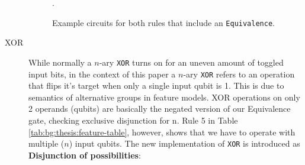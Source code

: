 \begin{description}
    \begin{figure}[H]
        \centering
        \caption[Equivalence Gate Circuit]{Example circuits for both rules that include an \texttt{Equivalence}.}.
        \label{fig:bg:thesis:equivalence-circuit}
    \end{figure}

    \item[XOR]
    While normally a $n$-ary \texttt{XOR} turns on for an uneven amount of toggled input bits, in the context of this paper a $n$-ary \texttt{XOR} refers to an operation that flips it’s target when only a single input qubit is 1. 
    This is due to semantics of alternative groups in feature models.
    XOR operations on only 2 operands (qubits) are basically the negated version of our Equivalence gate, checking exclusive disjunction for n. 
    Rule 5 in Table \ref{tab:bg:thesis:feature-table}, however, shows that we have to operate with multiple ($n$) input qubits.
    The new implementation of \texttt{XOR} is introduced as 
    \textbf{Disjunction of possibilities}: 
    

\end{description}
